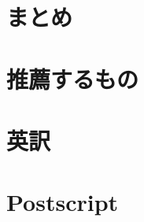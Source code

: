 \documentclass[
uplatex,
b5paper,
10pt,
dvipdfmx
]{jsbook}
\newif\ifEnglish
\newif\ifCHSummary
\newif\ifPOSTSCRIPT
\begin{document}

\ifCHSummary
\ifEnglish
\chapter{Summary}
\else
\chapter{まとめ}
\fi
\fi

\appendix
 
\chapter{推薦するもの}

\chapter{英訳}

\begin{itemize}\small

\end{itemize}


%



\backmatter
\ifPOSTSCRIPT


\ifEnglish
\chapter*{Postscript}
\else
\end{document}
